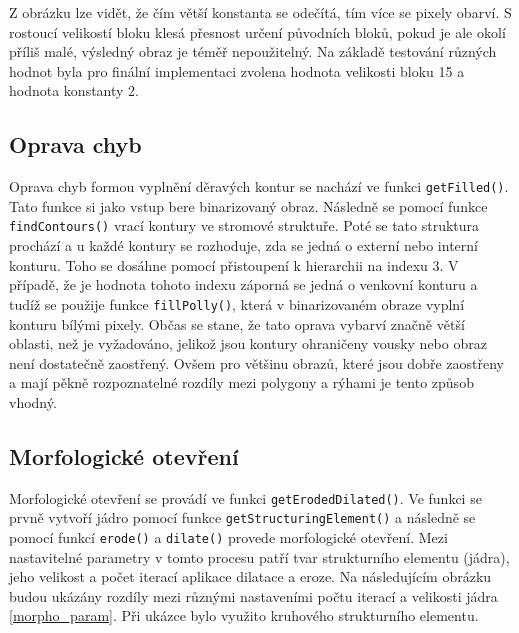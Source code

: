 Z obrázku lze vidět, že čím větší konstanta se odečítá, tím více se pixely obarví. S rostoucí velikostí bloku klesá přesnost určení původních bloků, pokud je ale okolí příliš malé, výsledný obraz je téměř nepoužitelný. Na základě testování různých hodnot byla pro finální implementaci zvolena hodnota velikosti bloku 15 a hodnota konstanty 2. 



\subsection{Oprava chyb}

Oprava chyb formou vyplnění děravých kontur se nachází ve funkci \texttt{getFilled()}. Tato funkce si jako vstup bere binarizovaný obraz. Následně se pomocí funkce \texttt{findContours()} vrací kontury ve stromové struktuře. Poté se tato struktura prochází a u každé kontury se rozhoduje, zda se jedná o externí nebo interní konturu. Toho se dosáhne pomocí přistoupení k hierarchii na indexu 3. V případě, že je hodnota tohoto indexu záporná se jedná o venkovní konturu a tudíž se použije funkce \texttt{fillPolly()}, která v binarizovaném obraze vyplní konturu bílými pixely. Občas se stane, že tato oprava vybarví značně větší oblasti, než je vyžadováno, jelikož jsou kontury ohraničeny vousky nebo obraz není dostatečně zaostřený. Ovšem pro většinu obrazů, které jsou dobře zaostřeny a mají pěkně rozpoznatelné rozdíly mezi polygony a rýhami je tento způsob vhodný.

\subsection{Morfologické otevření}

Morfologické otevření se provádí ve funkci \texttt{getErodedDilated()}. Ve funkci se prvně vytvoří jádro pomocí funkce \texttt{getStructuringElement()} a následně se pomocí funkcí \texttt{erode()} a \texttt{dilate()} provede morfologické otevření. Mezi nastavitelné parametry v tomto procesu patří tvar strukturního elementu (jádra), jeho velikost a počet iterací aplikace dilatace a eroze. Na následujícím obrázku budou ukázány rozdíly mezi různými nastaveními počtu iterací a velikosti jádra \ref{morpho_param}. Při ukázce bylo využito kruhového strukturního elementu.


